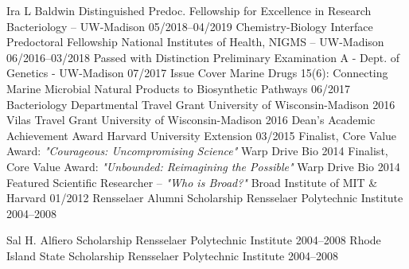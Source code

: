\newpage


\begin{cvhonors}
  \cvhonor
    {Ira L Baldwin Distinguished Predoc. Fellowship for Excellence in Research} %
    {Bacteriology -- UW-Madison} %
    {05/2018--04/2019} %
  \cvhonor
    {Chemistry-Biology Interface Predoctoral Fellowship} %
    {National Institutes of Health, NIGMS -- UW-Madison} %
    {06/2016--03/2018} %
  \cvhonor
    {Passed with Distinction} %
    {Preliminary Examination A - Dept. of Genetics - UW-Madison} %
    {07/2017} %
  \cvhonor
    {Issue Cover} %
    {Marine Drugs 15(6): Connecting Marine Microbial Natural Products to Biosynthetic Pathways} %
    {06/2017} %
  \cvhonor
    {Bacteriology Departmental Travel Grant} %
    {University of Wisconsin-Madison} %
    {2016} %
  \cvhonor
    {Vilas Travel Grant} %
    {University of Wisconsin-Madison} %
    {2016} %
  \cvhonor
    {Dean's Academic Achievement Award} %
    {Harvard University Extension} %
    {03/2015} %
  \cvhonor
    {Finalist, Core Value Award: \textit{"Courageous: Uncompromising Science"}} %
    {Warp Drive Bio} %
    {2014} %
  \cvhonor
    {Finalist, Core Value Award: \textit{"Unbounded: Reimagining the Possible"}} %
    {Warp Drive Bio} %
    {2014} %
  \cvhonor
    {Featured Scientific Researcher -- \textit{"Who is Broad?"}} %
    {Broad Institute of MIT \& Harvard} %
    {01/2012} %
  \cvhonor
    {Rensselaer Alumni Scholarship} %
    {Rensselaer Polytechnic Institute} %
    {2004--2008} %
\end{cvhonors}
\begin{cvhonors}
  \cvhonor
    {Sal H. Alfiero Scholarship} %
    {Rensselaer Polytechnic Institute} %
    {2004--2008} %
  \cvhonor
    {Rhode Island State Scholarship} %
    {Rensselaer Polytechnic Institute} %
    {2004--2008} %
\end{cvhonors}
